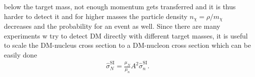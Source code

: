 below the target mass, not enough momentum gets transferred and it is thus harder to detect it and for higher masses the particle density $n_\chi=\rho/m_\chi$
decreases and the probability for an event as well. Since there are many experiments w try to detect DM directly with different target masses,
it is useful to scale the DM-nucleus cross section to a DM-nucleon cross section which can be easily done
\begin{align}
 \hat\sigma_N^\text{SI} = \frac{\mu_N}{\mu_n} A^2 \hat\sigma_n^\text{SI}.
\end{align}


